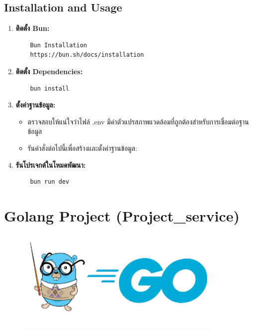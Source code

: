 \subsection{Installation and Usage}
\begin{enumerate}
    \item \textbf{ติดตั้ง Bun:}
    \begin{verbatim}
    Bun Installation 
    https://bun.sh/docs/installation
    \end{verbatim}
    \item \textbf{ติดตั้ง Dependencies:}
    \begin{verbatim}
    bun install
    \end{verbatim}
    \item \textbf{ตั้งค่าฐานข้อมูล:}
    \begin{itemize}
        \item ตรวจสอบให้แน่ใจว่าไฟล์ .env มีค่าตัวแปรสภาพแวดล้อมที่ถูกต้องสำหรับการเชื่อมต่อฐานข้อมูล
        \item รันคำสั่งต่อไปนี้เพื่อสร้างและตั้งค่าฐานข้อมูล:
    \end{itemize}
    \item \textbf{รันโปรเจกต์ในโหมดพัฒนา:}
    \begin{verbatim}
    bun run dev
    \end{verbatim}
\end{enumerate}

\section{Golang Project (Project\_service)}
\begin{figure}[H]
    \centering
    \includegraphics[width=100mm, keepaspectratio ]{pictures/golang.png}
\end{figure}
